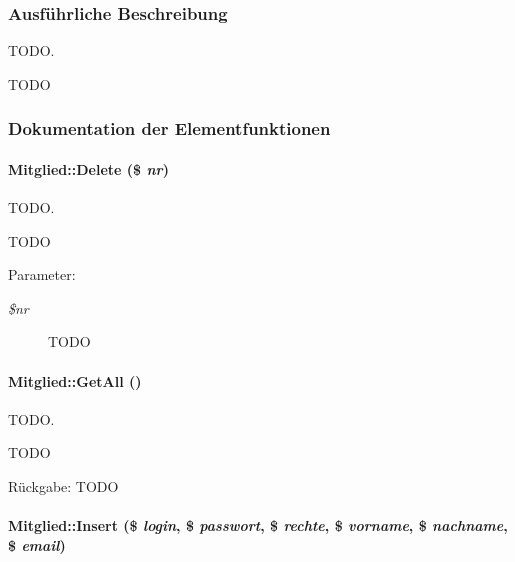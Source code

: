 \subsubsection{Ausf\"{u}hrliche Beschreibung}
TODO. 

TODO 



\subsubsection{Dokumentation der Elementfunktionen}
\hypertarget{classMitglied_c6900c12663e9b228bf9942fc045b8b4}{
\paragraph[Delete]{\setlength{\rightskip}{0pt plus 5cm}Mitglied::Delete (\$ {\em nr})}\hfill}
\label{classMitglied_c6900c12663e9b228bf9942fc045b8b4}


TODO. 

TODO \begin{Desc}
\item[Parameter:]
\begin{description}
\item[{\em \$nr}]TODO \end{description}
\end{Desc}
\hypertarget{classMitglied_70ce63c9c9a7159966dc9e80a7f726a2}{
\paragraph[GetAll]{\setlength{\rightskip}{0pt plus 5cm}Mitglied::Get\-All ()}\hfill}
\label{classMitglied_70ce63c9c9a7159966dc9e80a7f726a2}


TODO. 

TODO \begin{Desc}
\item[R\"{u}ckgabe:]TODO \end{Desc}
\hypertarget{classMitglied_a856527798258505adf9eb08b79fd9fc}{
\paragraph[Insert]{\setlength{\rightskip}{0pt plus 5cm}Mitglied::Insert (\$ {\em login}, \$ {\em passwort}, \$ {\em rechte}, \$ {\em vorname}, \$ {\em nachname}, \$ {\em email})}\hfill}
\label{classMitglied_a856527798258505adf9eb08b79fd9fc}


